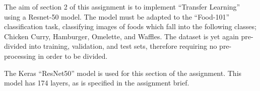 The aim of section 2 of this assignment is to implement ``Transfer Learning''
using a Resnet-50 model. The model must be adapted to the ``Food-101''
classification task, classifying images of foods which fall into the following
classes; Chicken Curry, Hamburger, Omelette, and Waffles. The dataset is yet
again pre-divided into training, validation, and test sets, therefore requiring
no pre-processing in order to be divided.

The Keras ``ResNet50'' model is used for this section of the assignment. This
model has 174 layers, as is specified in the assignment brief.
